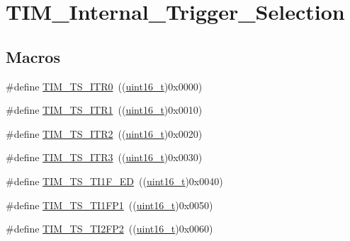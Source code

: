 \hypertarget{group___t_i_m___internal___trigger___selection}{}\section{T\+I\+M\+\_\+\+Internal\+\_\+\+Trigger\+\_\+\+Selection}
\label{group___t_i_m___internal___trigger___selection}
\subsection*{Macros}
\begin{DoxyCompactItemize}
\item 
\#define \hyperlink{group___t_i_m___internal___trigger___selection_gab7cf2b7db3956d4fd1e5a5d84f4891e7}{T\+I\+M\+\_\+\+T\+S\+\_\+\+I\+T\+R0}~((\hyperlink{_p_e___types_8h_a1f1825b69244eb3ad2c7165ddc99c956}{uint16\+\_\+t})0x0000)
\item 
\#define \hyperlink{group___t_i_m___internal___trigger___selection_gad90fbca297153ca9c0112a67ea2c6cb3}{T\+I\+M\+\_\+\+T\+S\+\_\+\+I\+T\+R1}~((\hyperlink{_p_e___types_8h_a1f1825b69244eb3ad2c7165ddc99c956}{uint16\+\_\+t})0x0010)
\item 
\#define \hyperlink{group___t_i_m___internal___trigger___selection_ga8599ba58a5f911d648503c7ac55d4320}{T\+I\+M\+\_\+\+T\+S\+\_\+\+I\+T\+R2}~((\hyperlink{_p_e___types_8h_a1f1825b69244eb3ad2c7165ddc99c956}{uint16\+\_\+t})0x0020)
\item 
\#define \hyperlink{group___t_i_m___internal___trigger___selection_ga63183e611b91c5847040172c0069514d}{T\+I\+M\+\_\+\+T\+S\+\_\+\+I\+T\+R3}~((\hyperlink{_p_e___types_8h_a1f1825b69244eb3ad2c7165ddc99c956}{uint16\+\_\+t})0x0030)
\item 
\#define \hyperlink{group___t_i_m___internal___trigger___selection_ga8c89554efc693e679c94b5a749af123c}{T\+I\+M\+\_\+\+T\+S\+\_\+\+T\+I1\+F\+\_\+\+ED}~((\hyperlink{_p_e___types_8h_a1f1825b69244eb3ad2c7165ddc99c956}{uint16\+\_\+t})0x0040)
\item 
\#define \hyperlink{group___t_i_m___internal___trigger___selection_ga38d3514d54bcdb0ea8ac8bd91c5832b5}{T\+I\+M\+\_\+\+T\+S\+\_\+\+T\+I1\+F\+P1}~((\hyperlink{_p_e___types_8h_a1f1825b69244eb3ad2c7165ddc99c956}{uint16\+\_\+t})0x0050)
\item 
\#define \hyperlink{group___t_i_m___internal___trigger___selection_ga0ed58a269bccd3f22d19cc9a2ba3123f}{T\+I\+M\+\_\+\+T\+S\+\_\+\+T\+I2\+F\+P2}~((\hyperlink{_p_e___types_8h_a1f1825b69244eb3ad2c7165ddc99c956}{uint16\+\_\+t})0x0060)

\end{DoxyCompactItemize}
